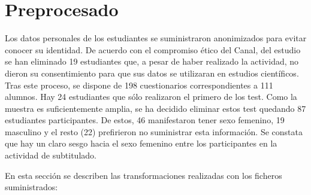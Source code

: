 \documentclass[
  12pt,
  a4paper,
  extrafontsizes,
  onecolumn,
  openright,
  table]{memoir}
\begin{document}
\hypertarget{sec-preprocesado}{%
\section{Preprocesado}\label{sec-preprocesado}}

Los datos personales de los estudiantes se suministraron anonimizados
para evitar conocer su identidad. De acuerdo con el compromiso ético del
Canal, del estudio se han eliminado 19 estudiantes que, a pesar de haber
realizado la actividad, no dieron su consentimiento para que sus datos
se utilizaran en estudios científicos. Tras este proceso, se dispone de
198 cuestionarios correspondientes a 111 alumnos. Hay 24 estudiantes que
sólo realizaron el primero de los test. Como la muestra es
suficientemente amplia, se ha decidido eliminar estos test quedando 87
estudiantes participantes. De estos, 46 manifestaron tener sexo
femenino, 19 masculino y el resto (22) prefirieron no suministrar esta
información. Se constata que hay un claro sesgo hacia el sexo femenino
entre los participantes en la actividad de subtitulado.

En esta sección se describen las transformaciones realizadas con los
ficheros suministrados:
\end{document}

